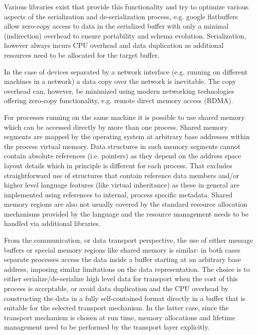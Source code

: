 \documentclass[a4paper,twoside]{article}
\begin{document}
Various libraries exist that provide this functionality and try to optimize various aspects of the serialization and de-serialization process, e.g. google flatbuffers\cite{flatbuffers} allow zero-copy access to data in the serialized buffer with only a minimal (indirection) overhead to ensure portability and schema evolution. Serialization, however always incurs CPU overhead and data duplication as additional resources need to be allocated for the target buffer.

In the case of devices separated by a network interface (e.g. running on different machines in a network) a data copy over the network is inevitable. The copy overhead can, however, be minimized using modern networking technologies offering zero-copy functionality, e.g. remote direct memory access (RDMA).

For processes running on the same machine it is possible to use shared memory which can be accessed directly by more than one process.
Shared memory segments are mapped by the operating system at arbitrary base addresses within the process virtual memory. Data structures in such memory segments cannot contain absolute references (i.e. pointers) as they depend on the address space layout details which in principle is different for each process.
That excludes straightforward use of structures that contain reference data members and/or higher level language features (like virtual inheritance) as these in general are implemented using references to internal, process specific metadata.
Shared memory regions are also not usually covered by the standard resource allocation mechanisms provided by the language and the resource management needs to be handled via additional libraries.

From the communication, or data transport perspective, the use of either message buffers or special memory regions like shared memory is similar: in both cases separate processes access the data inside a buffer starting at an arbitrary base address, imposing similar limitations on the data representation.
The choice is to either serialize/de-serialize high level data for transport when the cost of this process is acceptable, or avoid data duplication and the CPU overhead by constructing the data in a fully self-contained format directly in a buffer that is suitable for the selected transport mechanism. In the latter case, since the transport mechanism is chosen at run time, memory allocations and lifetime management need to be performed by the transport layer explicitly.
\end{document}

